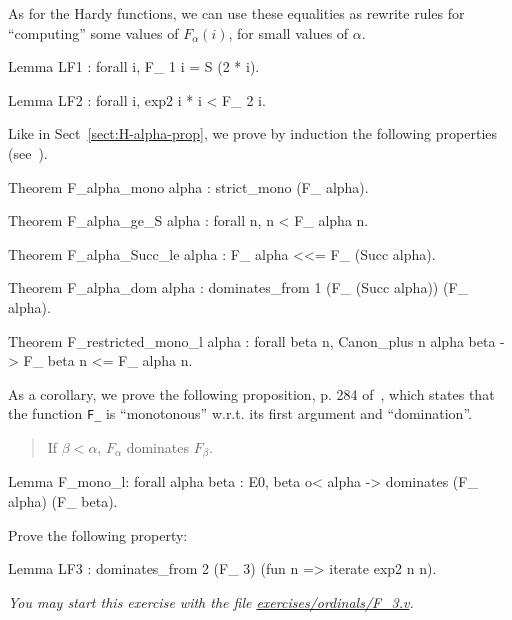 As for the Hardy functions, we can use these equalities as rewrite rules for
``computing'' some values of $F_\alpha(i)$, for small values of $\alpha$.

\begin{Coqsrc}
Lemma LF1 : forall i,  F_ 1 i = S (2 * i).

Lemma LF2 : forall i, exp2 i * i < F_ 2 i.
\end{Coqsrc}


Like in Sect~\ref{sect:H-alpha-prop}, we prove by induction the following properties (see~\cite{KS81}). 

\begin{Coqsrc}
Theorem F_alpha_mono alpha : strict_mono (F_ alpha).
 
Theorem F_alpha_ge_S alpha : forall n, n < F_ alpha n.

Theorem F_alpha_Succ_le alpha : F_ alpha <<= F_ (Succ alpha).

Theorem F_alpha_dom alpha : 
     dominates_from 1 (F_ (Succ alpha)) (F_ alpha).

Theorem F_restricted_mono_l alpha : 
   forall beta n, Canon_plus n alpha beta -> 
                                        F_ beta n <= F_ alpha n.
\end{Coqsrc}

As a corollary, we prove the following proposition, p. 284 of~\cite{KS81}, which states that the function \texttt{F\_} is ``monotonous'' w.r.t. its first argument and ``domination''.


\begin{quote}
  If $\beta<\alpha$, $F_\alpha$ dominates $F_\beta$.
\end{quote}

\begin{Coqsrc}
Lemma F_mono_l: forall alpha beta : E0, 
   beta o< alpha -> dominates (F_ alpha) (F_ beta).
\end{Coqsrc}


\begin{exercise}
Prove the following property:

\begin{Coqsrc}
Lemma LF3 : dominates_from  2 (F_ 3) (fun  n => iterate exp2 n n).
\end{Coqsrc}

\emph{You may start this exercise with the file
\href{https://github.com/coq-community/hydra-battles/tree/master/exercises/ordinals/F_3.v}{exercises/ordinals/F\_3.v}.}
\end{exercise}


